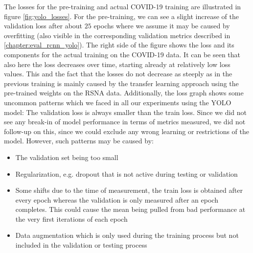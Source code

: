 The losses for the pre-training and actual COVID-19 training are illustrated in figure \ref{fig:yolo_losses}. For the pre-training, we can see a slight increase of the validation loss after about $25$ epochs where we assume it may be caused by overfitting (also visible in the corresponding validation metrics described in \ref{chapter:eval_rcnn_yolo}). The right side of the figure shows the loss and its components for the actual training on the COVID-19 data. It can be seen that also here the loss decreases over time, starting already at relatively low loss values. This and the fact that the losses do not decrease as steeply as in the previous training is mainly caused by the transfer learning approach using the pre-trained weights on the \ac{RSNA} data.
Additionally, the loss graph shows some uncommon patterns which we faced in all our experiments using the \ac{YOLO} model: The validation loss is always smaller than the train loss. Since we did not see any break-in of model performance in terms of metrics measured, we did not follow-up on this, since we could exclude any wrong learning or restrictions of the model. However, such patterns may be caused by:
\begin{itemize}
	\item The validation set being too small
	\item Regularization, e.g. dropout that is not active during testing or validation
	\item Some shifts due to the time of measurement, the train loss is obtained after every epoch whereas the validation is only measured after an epoch completes. This could cause the mean being pulled from bad performance at the very first iterations of each epoch
	\item Data augmentation which is only used during the training process but not included in the validation or testing process
\end{itemize}

